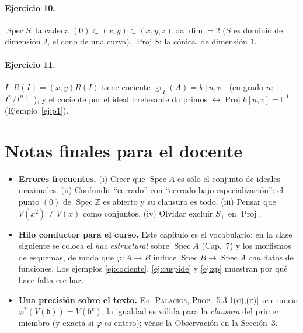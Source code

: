 \documentclass[11pt,a4paper]{article}
\newcommand{\Spec}{\operatorname{Spec}}
\newcommand{\Proj}{\operatorname{Proj}}
\newcommand{\gr}{\operatorname{gr}}
\newcommand{\PP}{\mathbb{P}}
\newcommand{\ZZ}{\mathbb{Z}}
\newcommand{\bbb}{\mathfrak{b}}
\theoremstyle{plain}
\theoremstyle{definition}
\theoremstyle{remark}
\newcounter{ej}
\newcommand{\libro}[1]{\textsc{[Palacios, #1]}}
\begin{document}
\paragraph{Ejercicio 10.} $\Spec S$: la cadena $(0)\subset(x,y)\subset(x,y,z)$ da $\dim=2$ ($S$ es dominio de dimensión $2$, el cono de una curva). $\Proj S$: la cónica, de dimensión $1$.

\paragraph{Ejercicio 11.} $I\cdot R(I)=(x,y)R(I)$ tiene cociente $\gr_I(A)=k[u,v]$ (en grado $n$: $I^n/I^{n+1}$), y el cociente por el ideal irrelevante da primos $\leftrightarrow\Proj k[u,v]=\PP^1$ (Ejemplo~\ref{ej:p1}).

\section*{Notas finales para el docente}

\begin{itemize}[itemsep=2pt]
\item \textbf{Errores frecuentes.} (i) Creer que $\Spec A$ es sólo el conjunto de ideales maximales. (ii) Confundir ``cerrado'' con ``cerrado bajo especialización'': el punto $(0)$ de $\Spec\ZZ$ es abierto y su clausura es todo. (iii) Pensar que $V(x^2)\ne V(x)$ como conjuntos. (iv) Olvidar excluir $S_+$ en $\Proj$.
\item \textbf{Hilo conductor para el curso.} Este capítulo es el vocabulario; en la clase siguiente se coloca el \emph{haz estructural} sobre $\Spec A$ (Cap.~7) y los morfismos de esquemas, de modo que $\varphi:A\to B$ induce $\Spec B\to\Spec A$ \emph{con} datos de funciones. Los ejemplos \ref{ej:cociente}, \ref{ej:cuspide} y \ref{ej:zp} muestran por qué hace falta ese haz.
\item \textbf{Una precisión sobre el texto.} En \libro{Prop.~5.3.1(c),(e)} se enuncia $\varphi^*(V(\bbb))=V(\bbb^c)$; la igualdad es válida para la \emph{clausura} del primer miembro (y exacta si $\varphi$ es entero); véase la Observación en la Sección~3.
\end{itemize}
\end{document}
